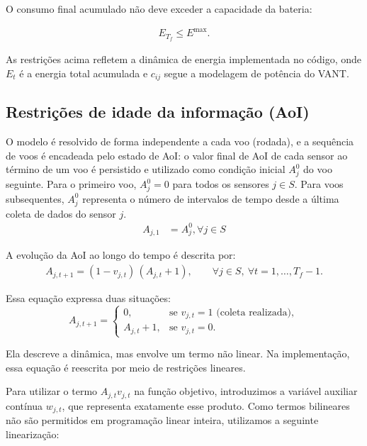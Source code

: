 \documentclass[
    12pt,
    oneside,
    a4paper,
    brazil
]{abntex2}
\begin{document}
    O consumo final acumulado não deve exceder a capacidade da bateria:
    
    \begin{align}
        E_{T_f} \le E^{\max}. \label{eq:energia-capacidade}
    \end{align}
    
    As restrições acima refletem a dinâmica de energia implementada no código, onde $E_t$ é a energia total acumulada e $c_{ij}$ segue a modelagem de potência do VANT.

    \subsection{Restrições de idade da informação (AoI)}

    O modelo é resolvido de forma independente a cada voo (rodada), e a sequência de voos é encadeada pelo estado de AoI: o valor final de AoI de cada sensor ao término de um voo é persistido e utilizado como condição inicial $A_j^0$ do voo seguinte. Para o primeiro voo, $A_j^0 = 0$ para todos os sensores $j \in S$. Para voos subsequentes, $A_j^0$ representa o número de intervalos de tempo desde a última coleta de dados do sensor $j$.
    \begin{align}
      A_{j,1} &= A_j^0, \forall j \in S \label{eq:aoi-inicial}
    \end{align}
    
    A evolução da AoI ao longo do tempo é descrita por:
    \begin{align}
        A_{j,t+1} = (1 - v_{j,t})\,(A_{j,t} + 1),
        \qquad \forall j \in S,\ \forall t = 1,\ldots,T_f-1.
        \label{eq:aoi-evolucao}
    \end{align}
    
    Essa equação expressa duas situações:
    \[
        A_{j,t+1} =
        \begin{cases}
            0, & \text{se } v_{j,t}=1 \text{ (coleta realizada)},\\[4pt]
            A_{j,t}+1, & \text{se } v_{j,t}=0.
        \end{cases}
    \]

    Ela descreve a dinâmica, mas envolve um termo não linear. Na implementação, essa equação é reescrita por meio de restrições lineares.

    Para utilizar o termo $A_{j,t} v_{j,t}$ na função objetivo, introduzimos a
    variável auxiliar contínua $w_{j,t}$, que representa exatamente esse produto.
    Como termos bilineares não são permitidos em programação linear inteira,
    utilizamos a seguinte linearização:
    
\end{document}
